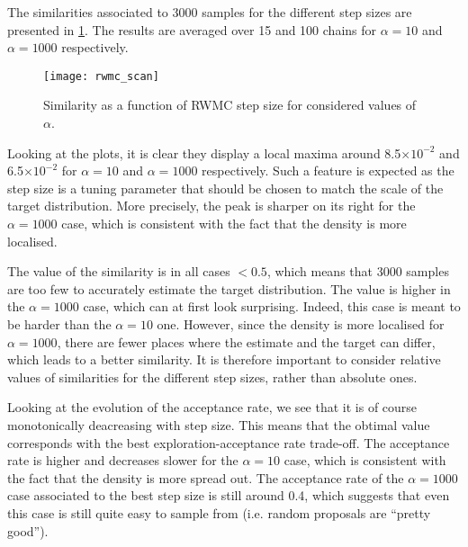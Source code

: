 \documentclass[a4paper, 12pt,oneside]{article}
\begin{document}
			The similarities associated to 3000 samples for the different step sizes are presented in \ref{fig:rwmc-scan}. The results are averaged over 15 and 100 chains for $\alpha=10$ and $\alpha=1000$ respectively. 
			\begin{figure}[htb]
				\centering
					\vspace{0em}
					\texttt{[image: rwmc\_scan]}
					\caption{Similarity as a function of RWMC step size for considered values of $\alpha$.}
					\label{fig:rwmc-scan}
			\end{figure}
			Looking at the plots, it is clear they display a local maxima around 8.5$\times 10^{-2}$ and 6.5$\times 10^{-2}$ for $\alpha=10$ and $\alpha=1000$ respectively. Such a feature is expected as the step size is a tuning parameter that should be chosen to match the scale of the target distribution.
			More precisely, the peak is sharper on its right for the $\alpha=1000$ case, which is consistent with the fact that the density is more localised. 
			
			The value of the similarity is in all cases $<0.5$, which means that 3000 samples are too few to accurately estimate the target distribution. The value is higher in the $\alpha=1000$ case, which can at first look surprising. Indeed, this case is meant to be harder than the $\alpha=10$ one. However, since the density is more localised for $\alpha=1000$, there are fewer places where the estimate and the target can differ, which leads to a better similarity. It is therefore important to consider relative values of similarities for the different step sizes, rather than  absolute ones.

			Looking at the evolution of the acceptance rate, we see that it is of course monotonically deacreasing with step size. This means that the obtimal value corresponds with the best exploration-acceptance rate trade-off. The acceptance rate is higher and decreases slower for the $\alpha=10$ case, which is consistent with the fact that the density is more spread out. The acceptance rate of the $\alpha=1000$ case associated to the best step size is still around 0.4, which suggests that even this case is still quite easy to sample from (i.e. random proposals are ``pretty good''). 
\end{document}
